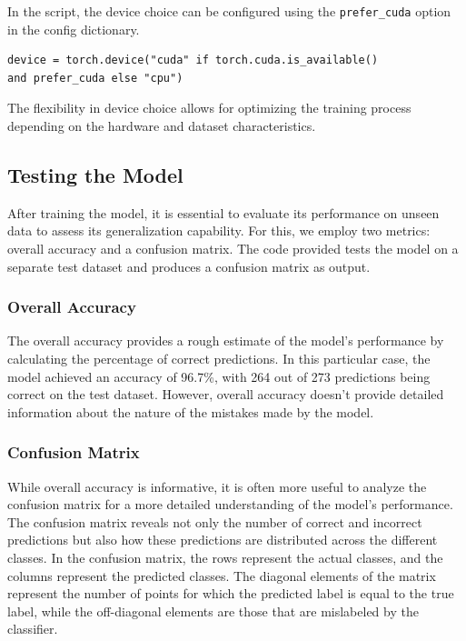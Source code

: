 In the script, the device choice can be configured using the \verb|prefer_cuda| option in the config dictionary.

\begin{verbatim}
device = torch.device("cuda" if torch.cuda.is_available()
and prefer_cuda else "cpu")
\end{verbatim}

The flexibility in device choice allows for optimizing the training process depending on the hardware and dataset characteristics.

\subsection{Testing the Model}

After training the model, it is essential to evaluate its performance on unseen data to assess its generalization capability. For this, we employ two metrics: overall accuracy and a confusion matrix. The code provided tests the model on a separate test dataset and produces a confusion matrix as output.

\subsubsection{Overall Accuracy}

The overall accuracy provides a rough estimate of the model's performance by calculating the percentage of correct predictions. In this particular case, the model achieved an accuracy of 96.7\%, with 264 out of 273 predictions being correct on the test dataset. However, overall accuracy doesn't provide detailed information about the nature of the mistakes made by the model.

\subsubsection{Confusion Matrix}

While overall accuracy is informative, it is often more useful to analyze the confusion matrix for a more detailed understanding of the model's performance. The confusion matrix reveals not only the number of correct and incorrect predictions but also how these predictions are distributed across the different classes. In the confusion matrix, the rows represent the actual classes, and the columns represent the predicted classes. The diagonal elements of the matrix represent the number of points for which the predicted label is equal to the true label, while the off-diagonal elements are those that are mislabeled by the classifier.

